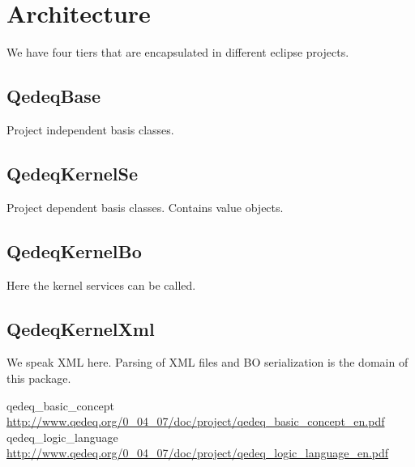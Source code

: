\documentclass[a4paper,german,10pt,twoside]{book}
\theoremstyle{definition}
\theoremstyle{remark}
\begin{document}
\section{Architecture} \label{chapter1_section3} \hypertarget{chapter1_section3}{}
We have four tiers that are encapsulated in different eclipse projects.

\subsection{QedeqBase
}
Project independent basis classes.


\subsection{QedeqKernelSe
}
Project dependent basis classes. Contains value objects.


\subsection{QedeqKernelBo
}
Here the kernel services can be called.


\subsection{QedeqKernelXml
}
We speak XML here. Parsing of XML files and BO serialization is the domain of this package.




\backmatter

\begin{thebibliography}{99}


 qedeq\_basic\_concept \url{http://www.qedeq.org/0_04_07/doc/project/qedeq_basic_concept_en.pdf}
 qedeq\_logic\_language \url{http://www.qedeq.org/0_04_07/doc/project/qedeq_logic_language_en.pdf}



\end{thebibliography}
 \printindex
\end{document}
